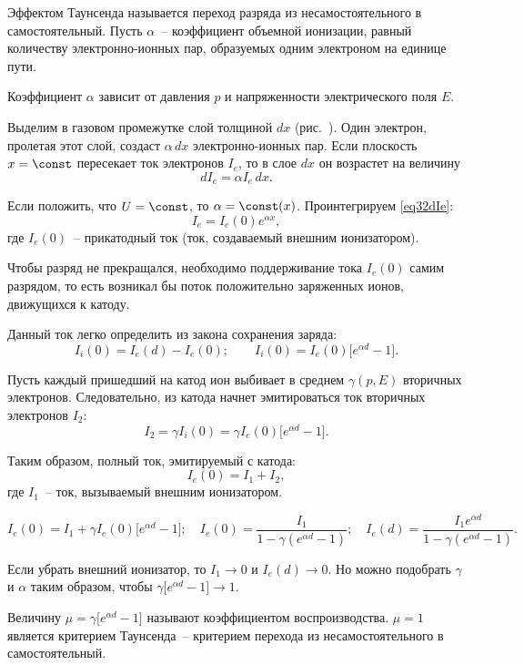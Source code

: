 Эффектом Таунсенда называется переход разряда из несамостоятельного в
самостоятельный. Пусть \( \alpha \)~-- коэффициент объемной ионизации, равный
количеству электронно-ионных пар, образуемых одним электроном на единице пути.

Коэффициент \( \alpha \) зависит от давления \( p \) и напряженности
электрического поля \( E \).

Выделим в газовом промежутке слой толщиной \( dx \) (рис.~).
Один электрон, пролетая этот слой, создаст \( \alpha\,dx \) электронно-ионных
пар. Если плоскость \( x = \const \) пересекает ток электронов \( I_e \), то в
слое \( dx \) он возрастет на величину
\begin{equation}
  dI_e = \alpha I_e\,dx.
  \label{eq32dIe}
\end{equation}

Если положить, что \( U = \const \), то \( \alpha = \const(x) \). Проинтегрируем
\eqref{eq32dIe}:
\begin{equation}
  I_e = I_e(0)e^{\alpha x},
  \label{eq32Ie}
\end{equation}
где \( I_e(0) \)~-- прикатодный ток (ток, создаваемый внешним ионизатором).

Чтобы разряд не прекращался, необходимо поддерживание тока \( I_e(0) \) самим
разрядом, то есть возникал бы поток положительно заряженных ионов, движущихся к
катоду.

Данный ток легко определить из закона сохранения заряда:
\[
  I_i(0) = I_e(d) - I_e(0); \qquad I_i(0) = I_e(0) \Big[ e^{\alpha d} - 1 \Big].
\]

Пусть каждый пришедший на катод ион выбивает в среднем \( \gamma(p, E) \)
вторичных электронов. Следовательно, из катода начнет эмитироваться ток
вторичных электронов \( I_2 \):
\[
  I_2 = \gamma I_i(0) = \gamma I_e(0) \Big[ e^{\alpha d} - 1 \Big].
\]

Таким образом, полный ток, эмитируемый с катода:
\[
  I_e(0) = I_1 + I_2,
\]
где \( I_1 \)~-- ток, вызываемый внешним ионизатором.

\[
  I_e(0) = I_1 + \gamma I_e(0) \Big[ e^{\alpha d} - 1 \Big]; \quad
    I_e(0) = \frac{I_1}{1 - \gamma(e^{\alpha d} - 1)}; \quad
    I_e(d) = \frac{I_1 e^{\alpha d}}{1 - \gamma(e^{\alpha d} - 1)}.
\]

Если убрать внешний ионизатор, то \( I_1 \to 0 \) и \( I_e(d) \to 0 \). Но
можно подобрать \( \gamma \) и \( \alpha \) таким образом, чтобы
\(
  \gamma \Big[ e^{\alpha d} - 1 \Big] \to 1
\).

Величину \( \mu = \gamma \Big[ e^{\alpha d} - 1 \Big] \) называют коэффициентом
воспроизводства. \( \mu = 1 \) является критерием Таунсенда~-- критерием
перехода из несамостоятельного в самостоятельный.

